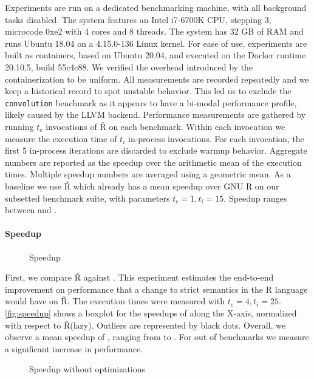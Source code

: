 \documentclass[review,screen,acmsmall]{acmart}
\renewcommand{\Rsh}{{\sf\v R}\xspace}
\begin{document}
Experiments are run on a dedicated benchmarking machine, with all background
tasks disabled. The system features an Intel i7-6700K CPU, stepping 3, microcode
0xe2 with 4 cores and 8 threads. The system has 32 GB of RAM and runs Ubuntu
18.04 on a 4.15.0-136 Linux kernel. For ease of use, experiments are built as
containers, based on Ubuntu 20.04, and executed on the Docker runtime 20.10.5,
build 55c4c88. We verified the overhead introduced by the containerization to be
uniform. All measurements are recorded repeatedly and we keep a historical
record to spot unstable behavior. This led us to exclude the
\lstinline{convolution} benchmark as it appears to have a bi-modal performance
profile, likely caused by the LLVM backend. Performance measurements are
gathered by running $t_e$ invocations of \Rsh on each benchmark. Within each
invocation we measure the execution time of $t_i$ in-process invocations. For
each invocation, the first 5 in-process iterations are discarded to exclude
warmup behavior. Aggregate numbers are reported as the speedup over the
arithmetic mean of the execution times. Multiple speedup numbers are averaged
using a geometric mean. As a baseline we use \Rsh which already has a
\speedupRsh mean speedup over GNU R on our subsetted benchmark suite, with
parameters $t_e = 1, t_i = 15$. Speedup ranges between \speedupRshMin and
\speedupRshMax.

\paragraph{Speedup}

\begin{figure}[h]
  \centering 
  \caption{Speedup} \label{fig:speedup}
\end{figure}

First, we compare \Rsh against \rshstrict. This experiment estimates the
end-to-end improvement on performance that a change to strict semantics in the R
language would have on \Rsh. The execution times were measured with $t_e = 4,
t_i = 25$. \autoref{fig:speedup} shows a boxplot for the speedups of \rshstrict
along the X-axis, normalized with respect to \Rsh (lazy). Outliers are
represented by black dots. Overall, we observe a mean speedup of
\speedupRshStrict, ranging from \speedupRshStrictMin to \speedupRshStrictMax.
For \speedupRshStrictSignificant out of \benchmarkSuiteSize benchmarks we
measure a significant increase in performance.
%
\begin{figure}[h]
  \centering
  
  \caption{Speedup without optimizations}
  \label{fig:speedup-bc}
\end{figure}
%
\end{document}
